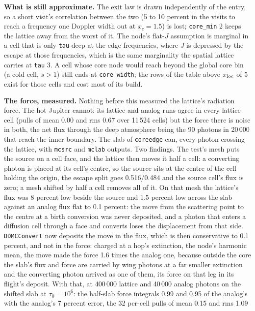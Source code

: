 \documentclass[11pt]{article}
\newcommand{\key}[1]{\texttt{#1}}
\begin{document}
\textbf{What is still approximate.}  The exit law is drawn independently of the entry,
so a short visit's correlation between the two (5 to 10 percent in the visits to reach a
frequency one Doppler width out at $x_c = 1.5$) is lost; \key{core\_min} 2 keeps the
lattice away from the worst of it.  The node's flat-$J$ assumption is marginal in a cell
that is only \key{tau} deep at the edge frequencies, where $J$ is depressed by the escape
at those frequencies, which is the same marginality the spatial lattice carries at
\key{tau} 3.  A cell whose core node would reach beyond the global core bin (a cold cell,
$s > 1$) still ends at \key{core\_width}; the rows of the table above $x_{\rm loc}$ of 5
exist for those cells and cost most of its build.

\textbf{The force, measured.}  Nothing before this measured the lattice's radiation
force.  The hot Jupiter cannot: its lattice and analog runs agree in every lattice cell
(pulls of mean 0.00 and rms 0.67 over 11\,524 cells) but the force there is noise in
both, the net flux through the deep atmosphere being the 90 photons in 20\,000 that
reach the inner boundary.  The slab of \texttt{coreedge} can, every photon crossing the
lattice, with \texttt{mcsrc} and \texttt{mclab} outputs.  Two findings.  The test's
mesh puts the source on a cell face, and the lattice then moves it half a cell: a
converting photon is placed at its cell's centre, so the source sits at the centre of
the cell holding the origin, the escape split goes 0.516/0.484 and the source cell's
flux is zero; a mesh shifted by half a cell removes all of it.  On that mesh the
lattice's flux was 8 percent low beside the source and 1.5 percent low across the slab
against an analog flux flat to 0.1 percent: the move from the scattering point to the
centre at a birth conversion was never deposited, and a photon that enters a diffusion
cell through a face and converts loses the displacement from that side.
\texttt{DDMCConvert} now deposits the move in the flux, which is then conservative to
0.1 percent, and not in the force: charged at a hop's extinction, the node's harmonic
mean, the move made the force 1.6 times the analog one, because outside the core the
slab's flux and force are carried by wing photons at a far smaller extinction and the
converting photon arrived as one of them, its force on that leg in its flight's
deposit.  With that, at 400\,000 lattice and 40\,000 analog photons on the shifted
slab at $\tau_0 = 10^6$: the half-slab force integrals 0.99 and 0.95 of the analog's
with the analog's 7 percent error, the 32 per-cell pulls of mean 0.15 and rms 1.09
\end{document}
